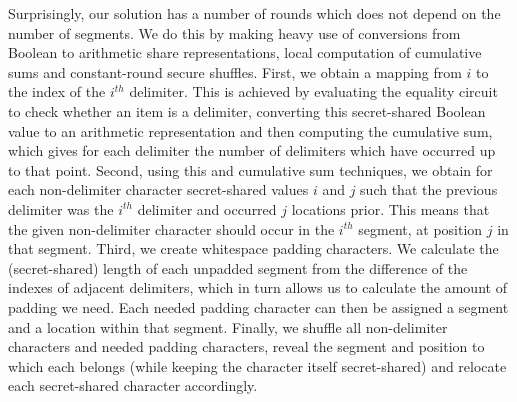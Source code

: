 Surprisingly, our solution has a number of rounds
which does not depend on the number of segments.
We do this by making heavy use of conversions from Boolean to arithmetic
share representations, local computation of cumulative sums 
and constant-round secure shuffles.
First, we obtain a mapping from $i$ to the index of the $i^{th}$ delimiter.
This is achieved by evaluating the equality circuit to check whether
an item is a delimiter, converting this secret-shared Boolean value to an
arithmetic representation and then computing the cumulative sum,
which gives for each delimiter the number of delimiters which have occurred up to
that point. 
Second, using this and cumulative sum techniques,
we obtain for each non-delimiter character secret-shared values $i$ and $j$ such that
the previous delimiter was the $i^{th}$ delimiter and occurred $j$ locations prior.
This means that the given non-delimiter character should occur in 
the $i^{th}$ segment, at position $j$ in that segment.
Third, we create whitespace padding characters.
We calculate the (secret-shared) length of each unpadded segment 
from the difference of the indexes of adjacent delimiters, 
which in turn allows us to calculate the amount of padding we need.
Each needed padding character can then be assigned a segment and a location
within that segment.
Finally, we shuffle all non-delimiter characters and needed padding characters,
reveal the segment and position to which each belongs (while keeping the character
itself secret-shared) and relocate each secret-shared character accordingly.


